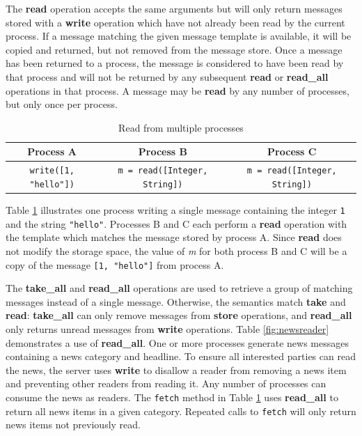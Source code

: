 \documentclass{llncs}
\begin{document}
The \textbf{read} operation accepts the same arguments but will only return messages stored with a \textbf{write} operation which have not already been read by the current process. If a message matching the given message template is available, it will be copied and returned, but not removed from the message store. Once a message has been returned to a process, the message is considered to have been read by that process and will not be returned by any subsequent \textbf{read} or \textbf{read\_all} operations in that process. A message may be \textbf{read} by any number of processes, but only once per process.

\begin{table}
\centering
\caption{Read from multiple processes}
\begin{tabular}{|c|c|c|} \hline
\textbf{Process A} & \textbf{Process B} & \textbf{Process C} \\ \hline
\texttt{write([1, "hello"])} & \texttt{m = read([Integer, String])} & \texttt{m = read([Integer, String])} \\ \hline
\end{tabular}
\label{fig:readprocesses}
\end{table}

Table \ref{fig:readprocesses} illustrates one process writing a single message containing the integer \texttt{1} and the string \texttt{"hello"}. Processes B and C each perform a \textbf{read} operation with the template which matches the message stored by process A. Since \textbf{read} does not modify the storage space, the value of \textit{m} for both process B and C will be a copy of the message \texttt{[1, "hello"]} from process A.

The \textbf{take\_all} and \textbf{read\_all} operations are used to retrieve a group of matching messages instead of a single message. Otherwise, the semantics match \textbf{take} and \textbf{read}: \textbf{take\_all} can only remove messages from \textbf{store} operations, and \textbf{read\_all} only returns unread messages from \textbf{write} operations. Table \ref{fig:newsreader} demonstrates a use of \textbf{read\_all}. One or more processes generate news messages containing a news category and headline. To ensure all interested parties can read the news, the server uses \textbf{write} to disallow a reader from removing a news item and preventing other readers from reading it. Any number of processes can consume the news as readers. The \texttt{fetch} method in Table \ref{fig:readprocesses} uses \textbf{read\_all} to return all news items in a given category. Repeated calls to \texttt{fetch} will only return news items not previously read.
\end{document}
